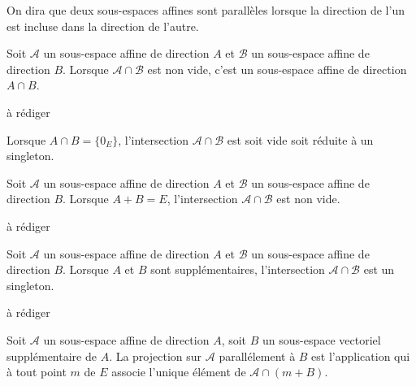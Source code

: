 \begin{defi}
 On dira que deux sous-espaces affines sont parallèles lorsque la direction de l'un est incluse dans la direction de l'autre. 
\end{defi}
\begin{prop}
 Soit $\mathcal A$ un sous-espace affine de direction $A$ et $\mathcal B$ un sous-espace affine de direction $B$. Lorsque $\mathcal A\cap \mathcal B$ est non vide, c'est un sous-espace affine de direction $A\cap B$.
\end{prop}
\begin{demo}
 à rédiger
\end{demo}
\begin{rem}
 Lorsque $A\cap B=\{0_E\}$, l'intersection $\mathcal A \cap \mathcal B$ est soit vide soit réduite à un singleton.
\end{rem}
\begin{prop}
 Soit $\mathcal A$ un sous-espace affine de direction $A$ et $\mathcal B$ un sous-espace affine de direction $B$. Lorsque $A+B=E$, l'intersection $\mathcal A\cap \mathcal B$ est non vide.
\end{prop}

\begin{demo}
 à rédiger
\end{demo}
\begin{prop}
 Soit $\mathcal A$ un sous-espace affine de direction $A$ et $\mathcal B$ un sous-espace affine de direction $B$. Lorsque $A$ et $B$ sont supplémentaires, l'intersection $\mathcal A\cap \mathcal B$ est un singleton.
\end{prop}
\begin{demo}
 à rédiger
\end{demo}
\begin{defi}
 Soit $\mathcal A$ un sous-espace affine de direction $A$, soit $B$ un sous-espace vectoriel supplémentaire de $A$. La projection sur $\mathcal A$ parallélement à $B$ est l'application qui à tout point $m$ de $E$ associe l'unique élément de $\mathcal A \cap(m+B)$.
\end{defi}

